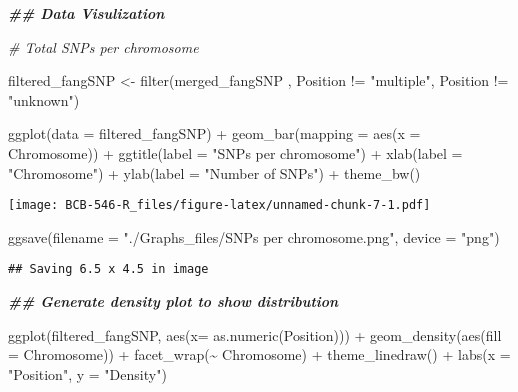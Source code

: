 \documentclass[
]{article}
\newenvironment{Shaded}{\begin{snugshade}}{\end{snugshade}}
\newcommand{\AttributeTok}[1]{\textcolor[rgb]{0.77,0.63,0.00}{#1}}
\newcommand{\CommentTok}[1]{\textcolor[rgb]{0.56,0.35,0.01}{\textit{#1}}}
\newcommand{\DocumentationTok}[1]{\textcolor[rgb]{0.56,0.35,0.01}{\textbf{\textit{#1}}}}
\newcommand{\FunctionTok}[1]{\textcolor[rgb]{0.00,0.00,0.00}{#1}}
\newcommand{\NormalTok}[1]{#1}
\newcommand{\OtherTok}[1]{\textcolor[rgb]{0.56,0.35,0.01}{#1}}
\newcommand{\SpecialCharTok}[1]{\textcolor[rgb]{0.00,0.00,0.00}{#1}}
\newcommand{\StringTok}[1]{\textcolor[rgb]{0.31,0.60,0.02}{#1}}
\begin{document}
\begin{Shaded}
\begin{Highlighting}[]
\DocumentationTok{\#\# Data Visulization}

\CommentTok{\# Total SNPs per chromosome}

\NormalTok{filtered\_fangSNP }\OtherTok{\textless{}{-}} \FunctionTok{filter}\NormalTok{(merged\_fangSNP , Position }\SpecialCharTok{!=} \StringTok{"multiple"}\NormalTok{,  Position }\SpecialCharTok{!=} \StringTok{"unknown"}\NormalTok{)}

\FunctionTok{ggplot}\NormalTok{(}\AttributeTok{data =}\NormalTok{ filtered\_fangSNP) }\SpecialCharTok{+}
  \FunctionTok{geom\_bar}\NormalTok{(}\AttributeTok{mapping =} \FunctionTok{aes}\NormalTok{(}\AttributeTok{x =}\NormalTok{ Chromosome)) }\SpecialCharTok{+}
  \FunctionTok{ggtitle}\NormalTok{(}\AttributeTok{label =} \StringTok{"SNPs per chromosome"}\NormalTok{) }\SpecialCharTok{+}
  \FunctionTok{xlab}\NormalTok{(}\AttributeTok{label =} \StringTok{"Chromosome"}\NormalTok{) }\SpecialCharTok{+}
  \FunctionTok{ylab}\NormalTok{(}\AttributeTok{label =} \StringTok{"Number of SNPs"}\NormalTok{) }\SpecialCharTok{+}
  \FunctionTok{theme\_bw}\NormalTok{()}
\end{Highlighting}
\end{Shaded}

\texttt{[image: BCB-546-R\_files/figure-latex/unnamed-chunk-7-1.pdf]}

\begin{Shaded}
\begin{Highlighting}[]
\FunctionTok{ggsave}\NormalTok{(}\AttributeTok{filename =} \StringTok{"./Graphs\_files/SNPs per chromosome.png"}\NormalTok{, }\AttributeTok{device =} \StringTok{"png"}\NormalTok{)}
\end{Highlighting}
\end{Shaded}

\begin{verbatim}
## Saving 6.5 x 4.5 in image
\end{verbatim}

\begin{Shaded}
\begin{Highlighting}[]
\DocumentationTok{\#\# Generate density plot to show distribution}

\FunctionTok{ggplot}\NormalTok{(filtered\_fangSNP, }\FunctionTok{aes}\NormalTok{(}\AttributeTok{x=} \FunctionTok{as.numeric}\NormalTok{(Position))) }\SpecialCharTok{+} \FunctionTok{geom\_density}\NormalTok{(}\FunctionTok{aes}\NormalTok{(}\AttributeTok{fill =}\NormalTok{ Chromosome)) }\SpecialCharTok{+} \FunctionTok{facet\_wrap}\NormalTok{(}\SpecialCharTok{\textasciitilde{}}\NormalTok{ Chromosome) }\SpecialCharTok{+} \FunctionTok{theme\_linedraw}\NormalTok{() }\SpecialCharTok{+} \FunctionTok{labs}\NormalTok{(}\AttributeTok{x =} \StringTok{"Position"}\NormalTok{, }\AttributeTok{y =} \StringTok{"Density"}\NormalTok{)}
\end{Highlighting}
\end{Shaded}
\end{document}

